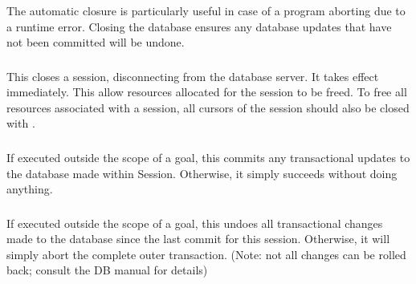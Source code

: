 The automatic closure is particularly useful in case of a
program aborting due to a runtime error. Closing the database ensures
any database updates that have not been committed will be undone.


\subsubsection{}
\label{session-close/1}

This closes a session, disconnecting from the database server. It
takes effect immediately. This allow resources allocated for the
session to be freed. To free all resources associated with a session,
all cursors of the session should also be closed with
. 


\subsubsection{}
\label{session-commit/1}

If executed outside the scope of a
goal, this commits any transactional updates to the database made within
 Session. 
 Otherwise, it simply succeeds without doing anything.

\subsubsection{}
\label{session-rollback/1}

If executed outside the scope of a
goal,
this undoes all transactional changes made to the database since the last
commit for this session. Otherwise, it will simply abort the complete outer
transaction. (Note: not all changes can be rolled back; consult the DB manual for details)

\subsubsection{}
\label{session-transaction/2}

